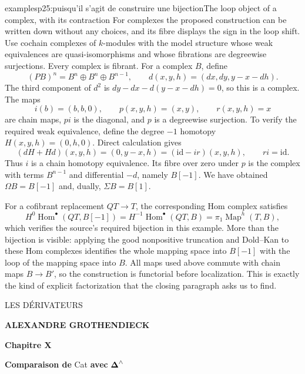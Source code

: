 \begin{dcomment}{examples}{p25:puisqu'il s'agit de construire une bijection}{The loop object of a complex, with its contraction}
For complexes the proposed construction can be written down without any choices, and its fibre displays the sign in the loop shift. Use cochain complexes of $k$-modules with the model structure whose weak equivalences are quasi-isomorphisms and whose fibrations are degreewise surjections. Every complex is fibrant. For a complex $B$, define
\[
 (P B)^n=B^n\oplus B^n\oplus B^{n-1},\qquad
 d(x,y,h)=(dx,dy,y-x-dh).
\]
The third component of $d^2$ is $dy-dx-d(y-x-dh)=0$, so this is a complex. The maps
\[
 i(b)=(b,b,0),\qquad p(x,y,h)=(x,y),\qquad r(x,y,h)=x
\]
are chain maps, $pi$ is the diagonal, and $p$ is a degreewise surjection. To verify the required weak equivalence, define the degree $-1$ homotopy $H(x,y,h)=(0,h,0)$. Direct calculation gives
\[
 (dH+Hd)(x,y,h)=(0,y-x,h)
               =(\mathrm{id}-ir)(x,y,h),\qquad ri=\mathrm{id}.
\]
Thus $i$ is a chain homotopy equivalence. Its fibre over zero under $p$ is the complex with terms $B^{n-1}$ and differential $-d$, namely $B[-1]$. We have obtained $\Omega B=B[-1]$ and, dually, $\Sigma B=B[1]$.

For a cofibrant replacement $Q T\to T$, the corresponding Hom complex satisfies
\[
 H^0\operatorname{Hom}^\bullet(QT,B[-1])
   =H^{-1}\operatorname{Hom}^\bullet(QT,B)
   =\pi_1\operatorname{Map}^{h}(T,B),
\]
which verifies the source's required bijection in this example. More than the bijection is visible: applying the good nonpositive truncation and Dold--Kan to these Hom complexes identifies the whole mapping space into $B[-1]$ with the loop of the mapping space into $B$. All maps used above commute with chain maps $B\to B'$, so the construction is functorial before localization. This is exactly the kind of explicit factorization that the closing paragraph asks us to find.
\end{dcomment}
\printedpage{}

\begin{center}
{\LARGE \textsf{LES DÉRIVATEURS}}

\bigskip

{\large \textbf{ALEXANDRE GROTHENDIECK}}

\vspace{3em}

{\large \textbf{Chapitre X}}

\medskip

{\large \textbf{Comparaison de} Cat \textbf{avec} $\boldsymbol{\Delta}^{\wedge}$}
\end{center}

